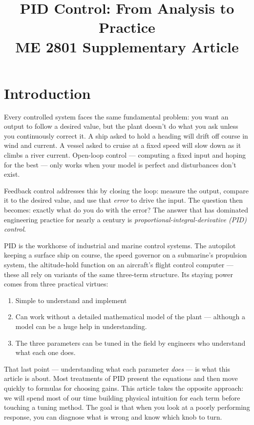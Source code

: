 \documentclass[12pt]{article}
\title{PID Control: From Analysis to Practice\\[0.5em]
\large ME 2801 Supplementary Article}
\author{}
\date{}
\begin{document}
\maketitle
\tableofcontents
\newpage

\section{Introduction}
\label{sec:intro}

Every controlled system faces the same fundamental problem: you want an output
to follow a desired value, but the plant doesn't do what you ask unless you
continuously correct it.  A ship asked to hold a heading will drift off course
in wind and current.  A vessel asked to cruise at a fixed speed will slow down
as it climbs a river current.  Open-loop control --- computing a fixed input
and hoping for the best --- only works when your model is perfect and
disturbances don't exist.

Feedback control addresses this by closing the loop: measure the output,
compare it to the desired value, and use that \emph{error} to drive the input.
The question then becomes: exactly what do you do with the error?  The answer
that has dominated engineering practice for nearly a century is
\emph{proportional-integral-derivative (PID) control}.

PID is the workhorse of industrial and marine control systems.  The autopilot
keeping a surface ship on course, the speed governor on a submarine's propulsion
system, the altitude-hold function on an aircraft's flight control computer ---
these all rely on variants of the same three-term structure.  Its staying power
comes from three practical virtues:
\begin{enumerate}
\item Simple to understand and implement
\item Can work without a detailed mathematical model of the plant --- although a
  model can be a huge help in understanding.
\item The three parameters can be tuned in the field by engineers who
  understand what each one does.
\end{enumerate}

That last point --- understanding what each parameter \emph{does} --- is what
this article is about.  Most treatments of PID present the equations and then
move quickly to formulas for choosing gains.  This article takes the opposite
approach: we will spend most of our time building physical intuition for each
term before touching a tuning method.  The goal is that when you look at a
poorly performing response, you can diagnose what is wrong and know which
knob to turn.
\end{document}
